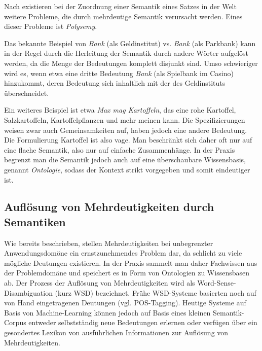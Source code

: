 \documentclass[12pt]{report}
\begin{document}
Nach \cite{car52} existieren bei der Zuordnung einer Semantik eines Satzes in der Welt weitere Probleme, die durch mehrdeutige Semantik verursacht werden. Eines dieser Probleme ist \textit{Polysemy}. 

Das bekannte Beispiel von \textit{Bank} (als Geldinstitut) vs. \textit{Bank} (als Parkbank) kann in der Regel durch die Herleitung der Semantik durch andere Wörter aufgelöst werden, da die Menge der Bedeutungen komplett disjunkt sind. Umso schwieriger wird es, wenn etwa eine dritte Bedeutung \textit{Bank} (als Spielbank im Casino) hinzukommt, deren Bedeutung sich inhaltlich mit der des Geldinstituts überschneidet. 

Ein weiteres Beispiel ist etwa \textit{\glqq  Max mag Kartoffeln\grqq{}}, das eine rohe Kartoffel, Salzkartoffeln, Kartoffelpflanzen und mehr meinen kann. Die Spezifizierungen weisen zwar auch Gemeinsamkeiten auf, haben jedoch eine andere Bedeutung. Die Formulierung Kartoffel ist also vage.
Man beschränkt sich daher oft nur auf eine flache Semantik, also nur auf einfache Zusammenhänge. In der Praxis begrenzt man die Semantik jedoch auch auf eine überschaubare Wissensbasis, genannt \textit{\glqq  Ontologie\grqq{}}, sodass der Kontext strikt vorgegeben und somit eindeutiger ist.

\subsection{Auflösung von Mehrdeutigkeiten durch Semantiken}
Wie bereits beschrieben, stellen Mehrdeutigkeiten bei unbegrenzter Anwendungsdomöne ein ernstzunehmendes Problem dar, da schlicht zu viele mögliche Deutungen existieren. In der Praxis sammelt man daher Fachwissen aus der Problemdomäne und speichert es in Form von Ontologien zu Wissensbasen ab. Der Prozess der Auflösung von Mehrdeutigkeiten wird als Word-Sense-Disambiguation (kurz WSD) bezeichnet. Frühe WSD-Systeme basierten noch auf von Hand eingetragenen Deutungen (vgl. POS-Tagging). Heutige Systeme auf Basis von Machine-Learning können jedoch auf Basis eines kleinen Semantik-Corpus entweder selbstständig neue Bedeutungen erlernen oder verfügen über ein gesondertes Lexikon von ausführlichen Informationen zur Auflösung von Mehrdeutigkeiten. 
\end{document}
